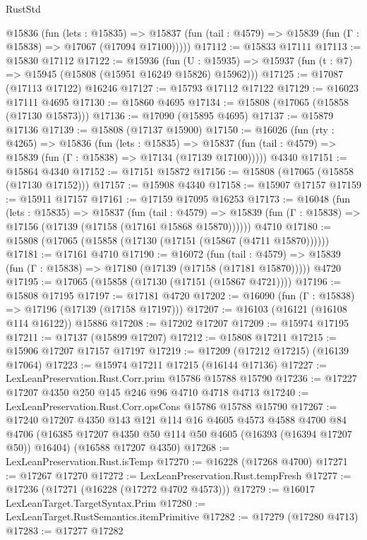 \begin{lexlean}{RustStd}
\begin{coremodule}
    @15836
      (fun (lets : @15835) =>
      @15837 (fun (tail : @4579) => @15839 (fun (Γ : @15838) => @17067 (@17094 @17100)))))
@17112 := @15833 @17111
@17113 := @15830 @17112
@17122 := @15936
    (fun (U : @15935) => @15937 (fun (t : @7) => @15945 (@15808 (@15951 @16249 @15826) @15962)))
@17125 := @17087 (@17113 @17122) @16246
@17127 := @15793 @17112 @17122
@17129 := @16023 @17111 @4695
@17130 := @15860 @4695
@17134 := @15808 (@17065 (@15858 (@17130 @15873)))
@17136 := @17090 (@15895 @4695)
@17137 := @15879 @17136
@17139 := @15808 (@17137 @15900)
@17150 := @16026
    (fun (rty : @4265) =>
    @15836
      (fun (lets : @15835) =>
      @15837 (fun (tail : @4579) => @15839 (fun (Γ : @15838) => @17134 (@17139 @17100)))))
    @4340
@17151 := @15864 @4340
@17152 := @17151 @15872
@17156 := @15808 (@17065 (@15858 (@17130 @17152)))
@17157 := @15908 @4340
@17158 := @15907 @17157
@17159 := @15911 @17157
@17161 := @17159 @17095 @16253
@17173 := @16048
    (fun (lets : @15835) =>
    @15837
      (fun (tail : @4579) =>
      @15839 (fun (Γ : @15838) => @17156 (@17139 (@17158 (@17161 @15868 @15870))))))
    @4710
@17180 := @15808 (@17065 (@15858 (@17130 (@17151 (@15867 (@4711 @15870))))))
@17181 := @17161 @4710
@17190 := @16072
    (fun (tail : @4579) => @15839 (fun (Γ : @15838) => @17180 (@17139 (@17158 (@17181 @15870)))))
    @4720
@17195 := @17065 (@15858 (@17130 (@17151 (@15867 @4721))))
@17196 := @15808 @17195
@17197 := @17181 @4720
@17202 := @16090 (fun (Γ : @15838) => @17196 (@17139 (@17158 @17197)))
@17207 := @16103 (@16121 (@16108 @114 @16122)) @15886
@17208 := @17202 @17207
@17209 := @15974 @17195
@17211 := @17137 (@15899 @17207)
@17212 := @15808 @17211
@17215 := @15906 @17207 @17157 @17197
@17219 := @17209 (@17212 @17215) (@16139 @17064)
@17223 := @15974 @17211 @17215 (@16144 @17136)
@17227 := LexLeanPreservation.Rust.Corr.prim @15786 @15788 @15790
@17236 := @17227 @17207 @4350 @250 @145 @246 @96 @4710 @4718 @4713
@17240 := LexLeanPreservation.Rust.Corr.opsCons @15786 @15788 @15790
@17267 := @17240
    @17207
    @4350
    @143
    @121
    @114
    @16
    @4605
    @4573
    @4588
    @4700
    @84
    @4706
    (@16385 @17207 @4350 @50 @114 @50 @4605 (@16393 (@16394 @17207 @50)) @16404)
    (@16588 @17207 @4350)
@17268 := LexLeanPreservation.Rust.isTemp
@17270 := @16228 (@17268 @4700)
@17271 := @17267 @17270
@17272 := LexLeanPreservation.Rust.tempFresh
@17277 := @17236 (@17271 (@16228 (@17272 @4702 @4573)))
@17279 := @16017 LexLeanTarget.TargetSyntax.Prim
@17280 := LexLeanTarget.RustSemantics.itemPrimitive
@17282 := @17279 (@17280 @4713)
@17283 := @17277 @17282

\end{coremodule}
\end{lexlean}
